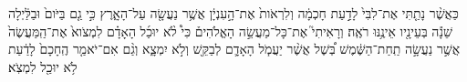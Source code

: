 \documentclass{openreader}
\begin{document}
כַּאֲשֶׁ֨ר נָתַ֤תִּי אֶת־לִבִּי֙ לָדַ֣עַת חָכְמָ֔ה וְלִרְאֹות֙ אֶת־הָ֣עִנְיָ֔ן אֲשֶׁ֥ר נַעֲשָׂ֖ה עַל־הָאָ֑רֶץ כִּ֣י גַ֤ם בַּיֹּום֙ וּבַלַּ֔יְלָה שֵׁנָ֕ה בְּעֵינָ֖יו אֵינֶ֥נּוּ רֹאֶֽה׃ 
וְרָאִיתִי֮ אֶת־כָּל־מַעֲשֵׂ֣ה הָאֱלֹהִים֒ כִּי֩ לֹ֨א יוּכַ֜ל הָאָדָ֗ם לִמְצֹוא֙ אֶת־הַֽמַּעֲשֶׂה֙ אֲשֶׁ֣ר נַעֲשָׂ֣ה תַֽחַת־הַשֶּׁ֔מֶשׁ בְּ֠שֶׁל אֲשֶׁ֨ר יַעֲמֹ֧ל הָאָדָ֛ם לְבַקֵּ֖שׁ וְלֹ֣א יִמְצָ֑א וְגַ֨ם אִם־יֹאמַ֤ר הֶֽחָכָם֙ לָדַ֔עַת לֹ֥א יוּכַ֖ל לִמְצֹֽא׃ 
\end{document}
